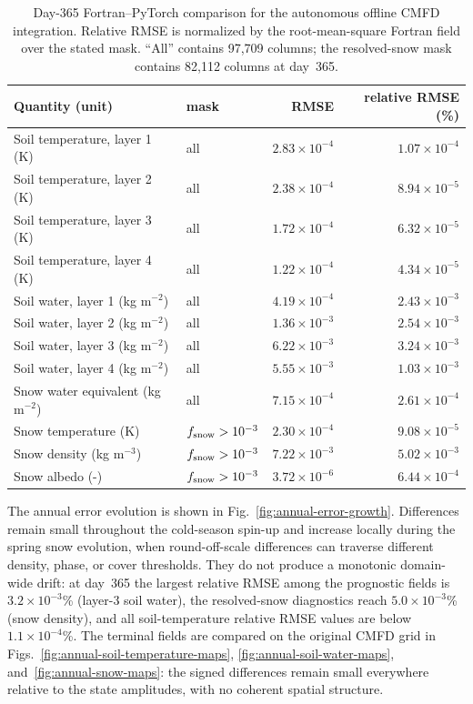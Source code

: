\begin{table}[t]
\caption{Day-365 Fortran--PyTorch comparison for the autonomous offline
CMFD integration. Relative RMSE is normalized by the root-mean-square
Fortran field over the stated mask. ``All'' contains 97,709 columns; the
resolved-snow mask contains 82,112 columns at day~365.}
\label{tab:annual-autonomous}
\centering
\small
\begin{tabular}{llrr}
\hline
Quantity (unit) & mask & RMSE & relative RMSE (\%) \\
\hline
Soil temperature, layer 1 (K) & all & $2.83\times10^{-4}$ & $1.07\times10^{-4}$ \\
Soil temperature, layer 2 (K) & all & $2.38\times10^{-4}$ & $8.94\times10^{-5}$ \\
Soil temperature, layer 3 (K) & all & $1.72\times10^{-4}$ & $6.32\times10^{-5}$ \\
Soil temperature, layer 4 (K) & all & $1.22\times10^{-4}$ & $4.34\times10^{-5}$ \\
Soil water, layer 1 (kg m$^{-2}$) & all & $4.19\times10^{-4}$ & $2.43\times10^{-3}$ \\
Soil water, layer 2 (kg m$^{-2}$) & all & $1.36\times10^{-3}$ & $2.54\times10^{-3}$ \\
Soil water, layer 3 (kg m$^{-2}$) & all & $6.22\times10^{-3}$ & $3.24\times10^{-3}$ \\
Soil water, layer 4 (kg m$^{-2}$) & all & $5.55\times10^{-3}$ & $1.03\times10^{-3}$ \\
Snow water equivalent (kg m$^{-2}$) & all & $7.15\times10^{-4}$ & $2.61\times10^{-4}$ \\
Snow temperature (K) & $f_{\rm snow}>10^{-3}$ & $2.30\times10^{-4}$ & $9.08\times10^{-5}$ \\
Snow density (kg m$^{-3}$) & $f_{\rm snow}>10^{-3}$ & $7.22\times10^{-3}$ & $5.02\times10^{-3}$ \\
Snow albedo (-) & $f_{\rm snow}>10^{-3}$ & $3.72\times10^{-6}$ & $6.44\times10^{-4}$ \\
\hline
\end{tabular}
\end{table}

The annual error evolution is shown in Fig.~\ref{fig:annual-error-growth}.
Differences remain small throughout the cold-season spin-up and increase
locally during the spring snow evolution, when round-off-scale differences
can traverse different density, phase, or cover thresholds. They do not
produce a monotonic domain-wide drift: at day~365 the largest relative RMSE
among the prognostic fields is $3.2\times10^{-3}$\% (layer-3 soil water),
the resolved-snow diagnostics reach $5.0\times10^{-3}$\% (snow density),
and all soil-temperature relative RMSE values are
below $1.1\times10^{-4}$\%. The terminal fields are compared on the original
CMFD grid in Figs.~\ref{fig:annual-soil-temperature-maps},
\ref{fig:annual-soil-water-maps}, and~\ref{fig:annual-snow-maps}:
the signed differences remain small everywhere relative to the state
amplitudes, with no coherent spatial structure.

